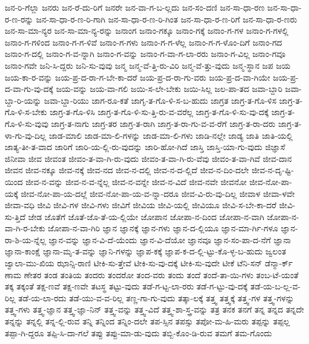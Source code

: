 {ಜನ-ರಿ-ಗೆಲ್ಲಾ
ಜನರು
ಜನ-ರೆ-ದು-ರಿಗೆ
ಜನರೇ
ಜನ-ವಾ-ಗ-ಬ-ಲ್ಲದು
ಜನ-ಸಂ-ದಣಿ
ಜನ-ಸಾ-ಧಾ-ರಣ
ಜನ-ಸಾ-ಧಾ-ರ-ಣ-ರನ್ನು
ಜನ-ಸಾ-ಧಾ-ರ-ಣ-ರಿ-ಗಾಗಿ
ಜನ-ಸಾ-ಧಾ-ರ-ಣ-ರಿ-ಗಿಂತ
ಜನ-ಸಾ-ಧಾ-ರ-ಣ-ರಿಗೆ
ಜನ-ಸಾ-ಧಾ-ರ-ಣರು
ಜನ-ಸಾ-ಮಾ-ನ್ಯರ
ಜನ-ಸಾ-ಮಾ-ನ್ಯ-ರನ್ನು
ಜನಾಂಗ
ಜನಾಂ-ಗಕ್ಕೂ
ಜನಾಂ-ಗಕ್ಕೆ
ಜನಾಂ-ಗ-ಗಳ
ಜನಾಂ-ಗ-ಗಳಲ್ಲಿ
ಜನಾಂ-ಗ-ಗಳಿಂದ
ಜನಾಂ-ಗ-ಗ-ಳಿವೆ
ಜನಾಂ-ಗ-ಗಳು
ಜನಾಂ-ಗ-ಗ-ಳೆಲ್ಲ
ಜನಾಂ-ಗ-ಗ-ಳೊಂ-ದಿಗೆ
ಜನಾಂ-ಗದ
ಜನಾಂ-ಗ-ದಲ್ಲಿ
ಜನಾಂ-ಗ-ವ-ನ್ನಾಗಿ
ಜನಾಂ-ಗ-ವನ್ನು
ಜನಾಂ-ಗ-ವಾ-ಗ-ಲಾ-ರರು
ಜನಾಂ-ಗ-ವಿಲ್ಲ
ಜನಾಂ-ಗವೂ
ಜನಾಂ-ಗವೇ
ಜನಿ-ಸಿ-ದ್ದರು
ಜನಿ-ಸು-ವುವು
ಜನ್ಮ
ಜನ್ಮ-ವೆ-ತ್ತಿ-ರು-ವಿರಿ
ಜನ್ಮ-ವೆ-ತ್ತು-ವುದು
ಜನ್ಮ-ಸ್ಥಾನ
ಜಪ
ಜಯ
ಜಯ-ಕಾ-ರ-ವನ್ನು
ಜಯ-ಪ್ರ-ದ-ರಾ-ಗ-ಬೇ-ಕಾ-ದರೆ
ಜಯ-ಪ್ರ-ದ-ರಾ-ಗು-ವರು
ಜಯ-ಪ್ರ-ದ-ವಾ-ಗಿಯೇ
ಜಯ-ಪ್ರ-ದ-ವಾ-ಗು-ವು-ದಕ್ಕೆ
ಜಯ-ವನ್ನು
ಜಯ-ವಾ-ಗಲಿ
ಜಯಿ-ಸ-ಲೇ-ಬೇಕು
ಜಯಿ-ಸಿಲ್ಲ
ಜಲ-ಪಾ-ತದ
ಜವಾ-ಬ್ದಾರಿ
ಜವಾ-ಬ್ದಾ-ರಿ-ಯನ್ನು
ಜವಾ-ಬ್ದಾ-ರಿಯು
ಜಾಗ-ರೂ-ಕತೆ
ಜಾಗೃ-ತ-ಗೊ-ಳಿ-ಸ-ಬ-ಹುದು
ಜಾಗ್ರತ
ಜಾಗ್ರ-ತ-ಗೊ-ಳಿಸ
ಜಾಗ್ರ-ತ-ಗೊ-ಳಿ-ಸ-ಬೇಕು
ಜಾಗ್ರ-ತ-ಗೊ-ಳಿಸಿ
ಜಾಗ್ರ-ತ-ಗೊ-ಳಿ-ಸು-ತ್ತಿ-ರು-ವ-ವರೆಲ್ಲ
ಜಾಗ್ರ-ತ-ಗೊ-ಳಿ-ಸು-ವು-ದಕ್ಕೆ
ಜಾಗ್ರ-ತ-ಗೊ-ಳಿ-ಸು-ವುವು
ಜಾಗ್ರ-ತ-ನಾಗು
ಜಾಗ್ರ-ತರ
ಜಾಗ್ರ-ತ-ರಾಗಿ
ಜಾಗ್ರ-ತ-ರಾ-ಗು-ವ-ವ-ರೆಗೆ
ಜಾಗ್ರ-ತ-ರಾ-ದರು
ಜಾಗ್ರ-ತ-ಳಾ-ಗು-ವು-ದಿಲ್ಲ
ಜಾಡ-ಮಾಲಿ
ಜಾಡ-ಮಾ-ಲಿ-ಗಳನ್ನು
ಜಾಡ-ಮಾ-ಲಿ-ಗಳು
ಜಾಡಿ-ನಲ್ಲೇ
ಜಾಡ್ಯ
ಜಾತಿ
ಜಾತಿ-ಯಲ್ಲಿ
ಜಾತ್ಯ-ತೀ-ತ-ವಾದ
ಜಾರಿಗೆ
ಜಾರಿ-ಯ-ಲ್ಲಿ-ರು-ವುದನ್ನು
ಜಾರಿ-ಹೋ-ಗಿದೆ
ಜಾಸ್ತಿ
ಜಾಸ್ತಿ-ಯಾ-ಗು-ವುದು
ಜಿಜ್ಞಾಸೆ
ಜಿನೀವಾ
ಜೀವ
ಜೀವಂತ
ಜೀವಂ-ತ-ವಾ-ಗಿ-ರು-ವುದು
ಜೀವಂ-ತ-ವಾ-ಗಿ-ರು-ವೆವು
ಜೀವಂ-ತ-ವಾ-ಗಿವೆ
ಜೀವ-ದಾನ
ಜೀವನ
ಜೀವ-ನಕ್ಕೂ
ಜೀವ-ನಕ್ಕೆ
ಜೀವ-ನದ
ಜೀವ-ನ-ದಲ್ಲಿ
ಜೀವ-ನ-ದ-ಲ್ಲಿದೆ
ಜೀವ-ನ-ದಿಂ-ದಲೇ
ಜೀವ-ನ-ದೃ-ಷ್ಟಿ-ಯಿಂದ
ಜೀವ-ನ-ವನ್ನು
ಜೀವ-ನ-ವ-ನ್ನೆಲ್ಲ
ಜೀವ-ನ-ವನ್ನೇ
ಜೀವ-ನ-ವಿದೆ
ಜೀವ-ನವೇ
ಜೀವನೋ
ಜೀವ-ನೋ-ಪಾ-ಯಕ್ಕೆ
ಜೀವ-ನೋ-ಪಾ-ಯ-ದಲ್ಲೆ
ಜೀವ-ನೋ-ಪಾ-ಯ-ವ-ನ್ನಾ-ದರೂ
ಜೀವ-ವಿ-ರು-ವು-ದಿಲ್ಲ
ಜೀವಾಳ
ಜೀವಾ-ಳವೇ
ಜೀವಾ-ವಧಿ
ಜೀವಿ
ಜೀವಿ-ಗಳ
ಜೀವಿ-ಗಳು
ಜೀವಿಗೆ
ಜೀವಿಯ
ಜೀವಿ-ಯಲ್ಲಿ
ಜೀವಿಯೂ
ಜೀವಿ-ಸ-ಬೇ-ಕಾ-ದರೆ
ಜೀವಿ-ಸು-ತ್ತಿದೆ
ಜೇಡ
ಜೊತೆಗೆ
ಜೊತೆ-ಜೊ-ತೆ-ಯ-ಲ್ಲಿಯೇ
ಜೋಪಾನ
ಜೋಪಾ-ನ-ದಿಂದ
ಜೋಪಾ-ನ-ವಾಗಿ
ಜೋಪಾ-ನ-ವಾ-ಗಿ-ರ-ಬೇಕು
ಜೋಪಾ-ನ-ವಾ-ಗಿರಿ
ಜ್ಞಾನ
ಜ್ಞಾನಕ್ಕೆ
ಜ್ಞಾನ-ಗಳು
ಜ್ಞಾನ-ದ-ಲ್ಲಿಯೂ
ಜ್ಞಾನ-ಮಾ-ರ್ಗಿ-ಗಳೂ
ಜ್ಞಾನ-ರಾ-ಶಿ-ಯ-ನ್ನೆಲ್ಲ
ಜ್ಞಾನ-ವನ್ನು
ಜ್ಞಾನ-ವಿ-ದೆ-ಯೆಂದು
ಜ್ಞಾನ-ವಿ-ದೆಯೋ
ಜ್ಞಾನವೂ
ಜ್ಞಾನ-ಸಂ-ಪಾ-ದ-ನೆಗೆ
ಜ್ಞಾನಾ
ಜ್ಞಾನಾ-ಕಾಂಕ್ಷೆ
ಜ್ಞಾನಾ-ಮೃ-ತ-ವನ್ನು
ಜ್ಞಾನಿ-ಗಳನ್ನು
ಜ್ಞಾಪ-ಕಕ್ಕೆ
ಜ್ಞಾಪ-ಕ-ದ-ಲ್ಲಿ-ಟ್ಟು-ಕೊ-ಳ್ಳ-ಬ-ಹುದು
ಜ್ವಲಂತ
ಜ್ವಾಲಾ-ಮು-ಖಿಯ
ಝಾನ್ಸಿ-ರಾಣಿ
ಟೀಕಿ-ಸು-ತ್ತೇವೆ
ಟೀಕಿ-ಸು-ವು-ದಕ್ಕೆ
ಟೀಕಿ-ಸು-ವುದೇ
ಟೀಕೆ
ಟೆನಿ-ಸನ್
ಡೆನ್ಮಾ-ರ್ಕ್
ಣಾಮ
ಣೇತರ
ತಂಡ
ತಂತಿಯ
ತಂದರು
ತಂದರೋ
ತಂದ-ವರು
ತಂದು
ತಂದೆ
ತಂದೆ-ತಾ-ಯಿ-ಗಳು
ತಂಬ-ಟೆ-ಯಂತೆ
ತಕ್ಕ
ತಕ್ಕಂತೆ
ತಕ್ಷ-ಣವೆ
ತಕ್ಷ-ಣವೇ
ತಟಸ್ಥ
ತಟ್ಟು-ವುದು
ತಡೆ-ಗ-ಟ್ಟ-ಲಾ-ರರು
ತಡೆ-ಗ-ಟ್ಟು-ವು-ದಕ್ಕೆ
ತಡೆ-ಯ-ಬ-ಲ್ಲ-ವ-ರಿಲ್ಲ
ತಡೆ-ಯ-ಲಾ-ರದು
ತಡೆ-ಯು-ವ-ವ-ರಿಲ್ಲ
ತಣ್ಣ-ಗಾ-ಗು-ವುದು
ತತ್ಕಾ-ಲಕ್ಕೆ
ತತ್ತ್ವ
ತತ್ತ್ವಕ್ಕೆ
ತತ್ತ್ವ-ಗಳ
ತತ್ತ್ವ-ಗಳನ್ನು
ತತ್ತ್ವ-ಗಳು
ತತ್ತ್ವ-ಜ್ಞಾನ
ತತ್ತ್ವ-ಜ್ಞಾ-ನಿನ್
ತತ್ತ್ವ-ವನ್ನು
ತತ್ತ್ವ-ವಿದೆ
ತತ್ತ್ವ-ಶಾ-ಸ್ತ್ರ-ವನ್ನು
ತತ್ರ
ತನಕ
ತನಗೆ
ತನ್ನ
ತನ್ನದ
ತನ್ನದೇ
ತನ್ನನ್ನು
ತನ್ನಲ್ಲಿ
ತನ್ನ-ಲ್ಲಿ-ರುವ
ತನ್ನಿ
ತನ್ನಿಂದ
ತನ್ನಿಂ-ದಲೇ
ತಪ-ಸ್ಸಿನ
ತಪಸ್ಸು
ತಪೋ-ಮ-ಹಿ-ಮರು
ತಪ್ಪನ್ನು
ತಪ್ಪಲ್ಲ
ತಪ್ಪಾ-ಗಿ-ದ್ದರೂ
ತಪ್ಪಿ-ಸಿ-ದಾ-ಗಲೆ
ತಪ್ಪು
ತಪ್ಪು-ಮಾ-ಡು-ವುದು
ತಬ್ಬಿ-ಕೊಂ-ಡಿ-ರುವ
ತಮಗೆ
ತಮ-ಗೊಂದು
}
